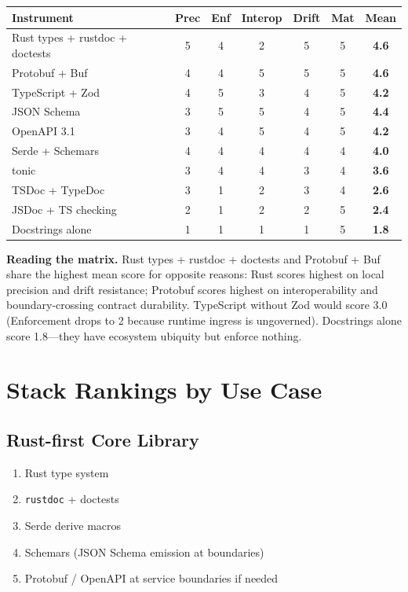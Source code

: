 \documentclass[11pt,a4paper]{article}
\theoremstyle{definition}
\begin{document}
\medskip
\begin{center}
\begin{tabular}{@{}l c c c c c c@{}}
\toprule
\textbf{Instrument} & \textbf{Prec} & \textbf{Enf} & \textbf{Interop} & \textbf{Drift} & \textbf{Mat} & \textbf{Mean} \\
\midrule
Rust types + rustdoc + doctests & 5 & 4 & 2 & 5 & 5 & \textbf{4.6} \\
Protobuf + Buf                  & 4 & 4 & 5 & 5 & 5 & \textbf{4.6} \\
TypeScript + Zod                & 4 & 5 & 3 & 4 & 5 & \textbf{4.2} \\
JSON Schema                     & 3 & 5 & 5 & 4 & 5 & \textbf{4.4} \\
OpenAPI 3.1                     & 3 & 4 & 5 & 4 & 5 & \textbf{4.2} \\
Serde + Schemars                & 4 & 4 & 4 & 4 & 4 & \textbf{4.0} \\
tonic                           & 3 & 4 & 4 & 3 & 4 & \textbf{3.6} \\
TSDoc + TypeDoc                 & 3 & 1 & 2 & 3 & 4 & \textbf{2.6} \\
JSDoc + TS checking             & 2 & 1 & 2 & 2 & 5 & \textbf{2.4} \\
Docstrings alone                & 1 & 1 & 1 & 1 & 5 & \textbf{1.8} \\
\bottomrule
\end{tabular}
\end{center}

\medskip

\noindent
\textbf{Reading the matrix.}
Rust types + rustdoc + doctests and Protobuf + Buf share the highest mean score for opposite reasons: Rust scores highest on local precision and drift resistance; Protobuf scores highest on interoperability and boundary-crossing contract durability. TypeScript without Zod would score 3.0 (Enforcement drops to 2 because runtime ingress is ungoverned). Docstrings alone score 1.8---they have ecosystem ubiquity but enforce nothing.

\section{Stack Rankings by Use Case}

\subsection{Rust-first Core Library}
\begin{enumerate}
\item Rust type system
\item \texttt{rustdoc} + doctests
\item Serde derive macros
\item Schemars (JSON Schema emission at boundaries)
\item Protobuf / OpenAPI at service boundaries if needed
\end{enumerate}
\end{document}
